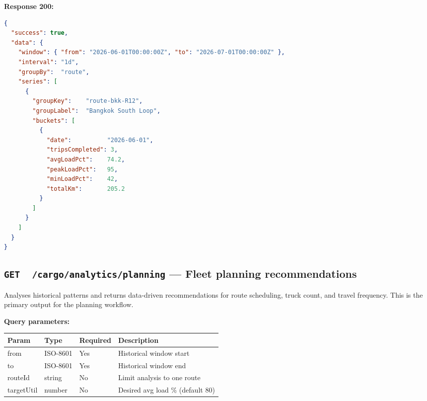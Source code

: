 \documentclass{article}
\newcommand{\GET}{\colorbox{evblue!20}{\texttt{\textbf{\color{evblue}GET}}}}
\begin{document}
\textbf{Response 200:}
\begin{lstlisting}[language=json, caption=Utilization analytics response]
{
  "success": true,
  "data": {
    "window": { "from": "2026-06-01T00:00:00Z", "to": "2026-07-01T00:00:00Z" },
    "interval": "1d",
    "groupBy":  "route",
    "series": [
      {
        "groupKey":    "route-bkk-R12",
        "groupLabel":  "Bangkok South Loop",
        "buckets": [
          {
            "date":          "2026-06-01",
            "tripsCompleted": 3,
            "avgLoadPct":    74.2,
            "peakLoadPct":   95,
            "minLoadPct":    42,
            "totalKm":       205.2
          }
        ]
      }
    ]
  }
}
\end{lstlisting}

\subsection{\GET\ \ \texttt{/cargo/analytics/planning} --- Fleet planning recommendations}

Analyses historical patterns and returns data-driven recommendations for
route scheduling, truck count, and travel frequency. This is the primary
output for the planning workflow.

\textbf{Query parameters:}

\begin{center}
\begin{tabular}{>{\ttfamily}llll}
\toprule
\textbf{Param} & \textbf{Type} & \textbf{Required} & \textbf{Description}\\
\midrule
from       & ISO-8601 & Yes & Historical window start\\
to         & ISO-8601 & Yes & Historical window end\\
routeId    & string   & No  & Limit analysis to one route\\
targetUtil & number   & No  & Desired avg load \% (default 80)\\
\bottomrule
\end{tabular}
\end{center}
\end{document}
